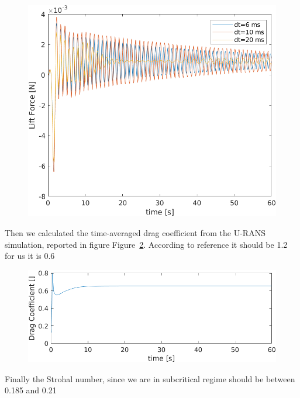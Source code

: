 \documentclass[12pt]{article}
\begin{document}
        \begin{figure}[!ht]
                \includegraphics[width=\textwidth]{LiftForce.png}
                \centering
                \caption{}
                \label{fig:lift}
        \end{figure}
        
Then we calculated the time-averaged drag coefficient from the U-RANS simulation, reported in figure Figure~\ref{fig:coeff}. According to reference it should be 1.2 for us it is 0.6
        \begin{figure}[!ht]
                \includegraphics[width=\textwidth]{Coefficients.png}
                \centering
                \caption{}
                \label{fig:coeff}
        \end{figure}
        
Finally the Strohal number, since we are in subcritical regime should be between 0.185 and 0.21






















\end{document}
